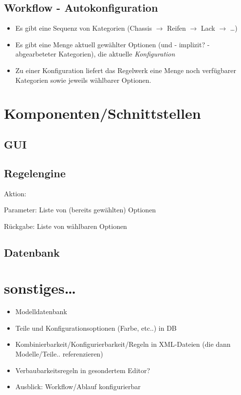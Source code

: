 \documentclass[a4paper,10pt]{article}
\begin{document}
\subsection*{Workflow - Autokonfiguration}
\begin{itemize}
 \item Es gibt eine Sequenz von Kategorien (Chassis $\rightarrow$ Reifen $\rightarrow$ Lack $\rightarrow$ \ldots)
 \item Es gibt eine Menge aktuell gewählter Optionen (und - implizit? - abgearbeteter Kategorien), die aktuelle \emph{Konfiguration}
 \item Zu einer Konfiguration liefert das Regelwerk eine Menge noch verfügbarer Kategorien sowie jeweils wählbarer Optionen.
\end{itemize}


\section{Komponenten/Schnittstellen}

\subsection*{GUI}

\subsection*{Regelengine}

Aktion:
 

Parameter:
 Liste von (bereits gewählten) Optionen

Rückgabe:
 Liste von wählbaren Optionen

\subsection*{Datenbank}


\section{sonstiges\ldots}
\begin{itemize}
 \item Modelldatenbank
 \item Teile und Konfigurationsoptionen (Farbe, etc..) in DB
 \item Kombinierbarkeit/Konfigurierbarkeit/Regeln in XML-Dateien (die dann Modelle/Teile.. referenzieren)
 \item Verbaubarkeitsregeln in gesondertem Editor?
 \item Ausblick: Workflow/Ablauf konfigurierbar
\end{itemize}
\end{document}
